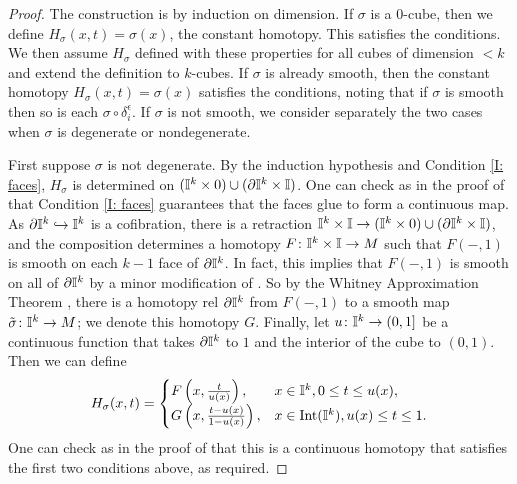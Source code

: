 \begin{proof}
	The construction is by induction on dimension.
	If $\sigma$ is a $0$-cube, then we define $H_\sigma(x,t) = \sigma(x)$, the constant homotopy.
	This satisfies the conditions.
	We then assume $H_\sigma$ defined with these properties for all cubes of dimension $<k$ and extend the definition to $k$-cubes.
	If $\sigma$ is already smooth, then the constant homotopy $H_\sigma(x,t) = \sigma(x)$ satisfies the conditions, noting that if $\sigma$ is smooth then so is each $\sigma \circ \delta_i^\epsilon$.
	If $\sigma$ is not smooth, we consider separately the two cases when $\sigma$ is degenerate or nondegenerate.

	First suppose $\sigma$ is not degenerate.
	By the induction hypothesis and Condition \eqref{I: faces}, $H_\sigma$ is determined on $(\mathbb{I}^k \times 0) \cup (\partial \mathbb{I}^k \times \mathbb{I})$.
	One can check as in the proof of \cite[Lemma 18.8]{Lee13} that Condition \eqref{I: faces} guarantees that the faces glue to form a continuous map.
	As $\partial \mathbb{I}^k \hookrightarrow \mathbb{I}^k$ is a cofibration, there is a retraction $\mathbb{I}^k \times \mathbb{I} \to (\mathbb{I}^k \times 0) \cup (\partial \mathbb{I}^k \times \mathbb{I})$, and the composition determines a homotopy $F \colon \mathbb{I}^k \times \mathbb{I} \to M$ such that $F(-,1)$ is smooth on each $k-1$ face of $\partial \mathbb{I}^k$.
	In fact, this implies that $F(-,1)$ is smooth on all of $\partial \mathbb{I}^k$ by a minor modification of \cite[Lemma 18.9]{Lee13}.
	So by the Whitney Approximation Theorem \cite[Theorem 6.26]{Lee13}, there is a homotopy rel $\partial \mathbb{I}^k$ from $F(-,1)$ to a smooth map $\tilde \sigma \colon \mathbb{I}^k \to M$; we denote this homotopy $G$.
	Finally, let $u \colon \mathbb{I}^k \to (0,1]$ be a continuous function that takes $\partial\mathbb{I}^k$ to $1$ and the interior of the cube to $(0,1)$.
	Then we can define
	\begin{equation*}
		H_\sigma(x,t) =
		\begin{cases}
			F\left(x,\frac{t}{u(x)}\right),&x \in \mathbb{I}^k, 0 \leq t \leq u(x),\\
			G\left(x,\frac{t-u(x)}{1-u(x)}\right),&x \in \text{Int}(\mathbb{I}^k), u(x) \leq t \leq 1.\\
		\end{cases}
	\end{equation*}
	One can check as in the proof of \cite[Lemma 18.8]{Lee13} that this is a continuous homotopy that satisfies the first two conditions above, as required.


\end{proof}

